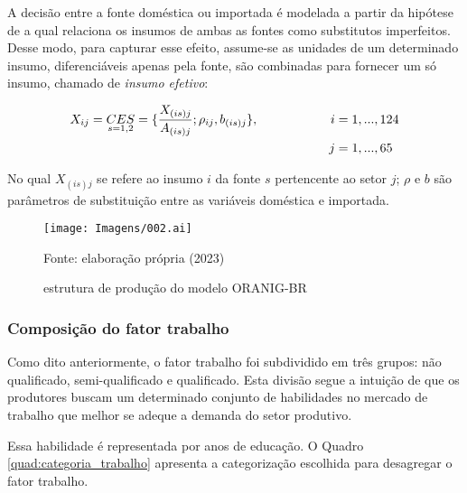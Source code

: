 A decisão entre a fonte doméstica ou importada é modelada a partir da hipótese de \textcite{armington69} a qual relaciona os insumos de ambas as fontes como substitutos imperfeitos. Desse modo, para capturar esse efeito, assume-se as unidades de um determinado insumo, diferenciáveis apenas pela fonte, são combinadas para fornecer um só insumo, chamado de \textit{insumo efetivo}:

\begin{align}
	X_{ij} = \underset{s = 1, 2}{CES} = \{\frac{X_{(is)j}}{A_{(is)j}}; \rho_{ij}, b_{(is)j}\}, \hspace{2cm} i & = 1, ... , 124 \\ j & = 1, ... , 65 \notag
\end{align}

No qual $X_{(is)j}$ se refere ao insumo $i$ da fonte $s$ pertencente ao setor $j$; $\rho$ e $b$ são parâmetros de substituição entre as variáveis doméstica e importada. 

\begin{landscape}
	\begin{figure}
		\centering
		\texttt{[image: Imagens/002.ai]}
		\caption{estrutura de produção do modelo ORANIG-BR}
		\label{fig:estrutura_producao}
		\footnotesize
		Fonte: elaboração própria (2023)
	\end{figure}
\end{landscape}

\subsubsection{Composição do fator trabalho} \label{}

Como dito anteriormente, o fator trabalho foi subdividido em três grupos: não qualificado, semi-qualificado e qualificado. Esta divisão segue a intuição de que os produtores buscam um determinado conjunto de habilidades no mercado de trabalho que melhor se adeque a demanda do setor produtivo.

Essa habilidade é representada por anos de educação. O Quadro \ref{quad:categoria_trabalho} apresenta a categorização escolhida para desagregar o fator trabalho.

